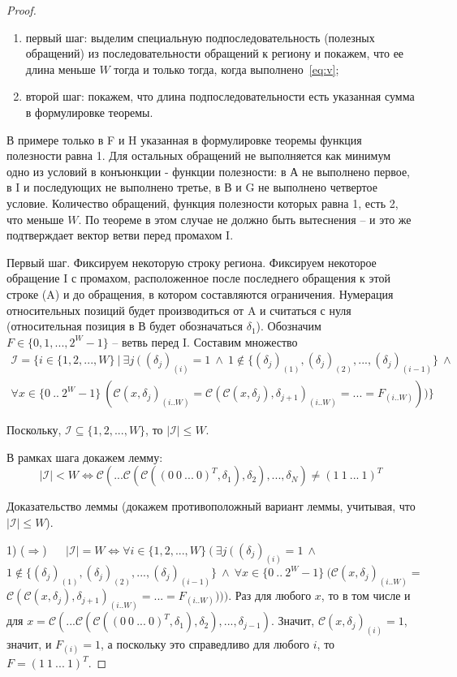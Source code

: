 \begin{proof}
\begin{enumerate}
    \item первый шаг: выделим специальную подпоследовательность (полезных обращений) из последовательности обращений к региону и покажем, что ее длина меньше $W$ тогда и только тогда, когда выполнено~\ref{eq:v};
        
    \item второй шаг: покажем, что длина подпоследовательности есть указанная сумма в формулировке теоремы.
  \end{enumerate}
  
  В примере только в F и H указанная в формулировке теоремы функция полезности равна 1. Для остальных обращений не выполняется как минимум одно из условий в конъюнкции - функции полезности: в А не выполнено первое, в I и последующих не выполнено третье, в В и G не выполнено четвертое условие. Количество обращений, функция полезности которых равна 1, есть 2, что меньше $W$. По теореме в этом случае не должно быть вытеснения -- и это же подтверждает вектор ветви перед промахом I.
  
  Первый шаг. Фиксируем некоторую строку региона. Фиксируем некоторое обращение I с промахом, расположенное после последнего обращения к этой строке (A) и до обращения, в котором составляются ограничения. Нумерация относительных позиций будет производиться от A и считаться с нуля (относительная позиция в В будет обозначаться $\delta_1$). Обозначим $F \in \{0, 1, ..., 2^W-1\}$ -- ветвь перед I. Составим множество
  $$\begin{array}{c}\mathcal{I} = \{i \in \{1, 2, ..., W\} ~|~ \exists j ~(~ (\delta_j)_{(i)} = 1 ~\wedge~ 
   1 \notin \{ (\delta_j)_{(1)}, (\delta_j)_{(2)}, ..., (\delta_j)_{(i-1)} \} ~\wedge~\\
   \forall x \in \{0~..~2^W{-}1\}~(  \mathcal{C}(x, \delta_j)_{(i..W)} = \mathcal{C}(\mathcal{C}(x, \delta_j), \delta_{j+1})_{(i..W)} = ... = F_{(i..W)}) ) \}\end{array}$$
   
   Поскольку, $\mathcal{I} \subseteq \{1, 2, ..., W\}$, то $|\mathcal{I}| \leqslant W$.
   
   В рамках шага докажем лемму: $$|\mathcal{I}| < W \Leftrightarrow \mathcal{C}( ...  \mathcal{C}(  \mathcal{C}( (0~0~...~0)^T, \delta_1), \delta_2), ..., \delta_N) \neq (1~1~...~1)^T$$
   
   Доказательство леммы (докажем противоположный вариант леммы, учитывая, что $|\mathcal{I}| \leqslant W$).
   
   1) ($\Rightarrow$) ~~ $|\mathcal{I}| = W \Leftrightarrow \forall i \in \{1, 2, ..., W\} ~(~ \exists j ~(~ (\delta_j)_{(i)} = 1 ~\wedge~$ \\ $1 \notin \{ (\delta_j)_{(1)}, (\delta_j)_{(2)}, ..., (\delta_j)_{(i-1)} \} ~\wedge~
   \forall x \in \{0~..~2^W{-}1\}~(  \mathcal{C}(x, \delta_j)_{(i..W)} =$\\
    $\mathcal{C}(\mathcal{C}(x, \delta_j), \delta_{j+1})_{(i..W)} = ... = F_{(i..W)}) ) )$. Раз для любого $x$, то в том числе и для $x = \mathcal{C}( ...  \mathcal{C}(  \mathcal{C}( (0~0~...~0)^T, \delta_1), \delta_2), ..., \delta_{j-1})$. Значит, $\mathcal{C}(x, \delta_j)_{(i)} = 1$, значит, и $F_{(i)} = 1$, а поскольку это справедливо для любого $i$, то $F = (1~1~...~1)^T$.
   

\end{proof}
